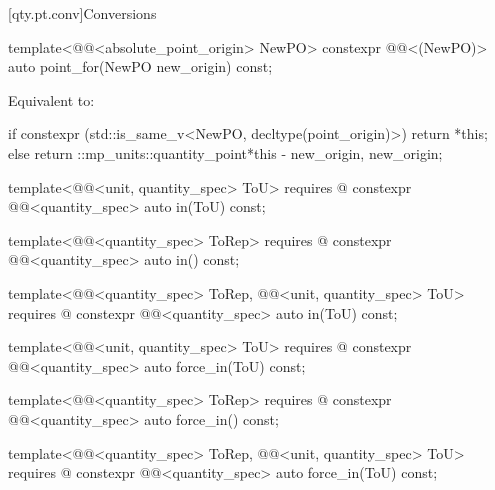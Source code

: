 [qty.pt.conv]{Conversions}

\begin{itemdecl}
template<@@<absolute_point_origin> NewPO>
constexpr @@<(NewPO{})> auto point_for(NewPO new_origin) const;
\end{itemdecl}

\begin{itemdescr}
\pnum
\effects
Equivalent to:
\begin{codeblock}
if constexpr (std::is_same_v<NewPO, decltype(point_origin)>)
  return *this;
else
  return ::mp_units::quantity_point{*this - new_origin, new_origin};
\end{codeblock}
\end{itemdescr}

\begin{itemdecl}
template<@@<unit, quantity_spec> ToU>
  requires @\seebelownc@
constexpr @@<quantity_spec> auto in(ToU) const;

template<@@<quantity_spec> ToRep>
  requires @\seebelownc@
constexpr @@<quantity_spec> auto in() const;

template<@@<quantity_spec> ToRep,
         @@<unit, quantity_spec> ToU>
  requires @\seebelownc@
constexpr @@<quantity_spec> auto in(ToU) const;

template<@@<unit, quantity_spec> ToU>
  requires @\seebelownc@
constexpr @@<quantity_spec> auto force_in(ToU) const;

template<@@<quantity_spec> ToRep>
  requires @\seebelownc@
constexpr @@<quantity_spec> auto force_in() const;

template<@@<quantity_spec> ToRep,
         @@<unit, quantity_spec> ToU>
  requires @\seebelownc@
constexpr @@<quantity_spec> auto force_in(ToU) const;
\end{itemdecl}

